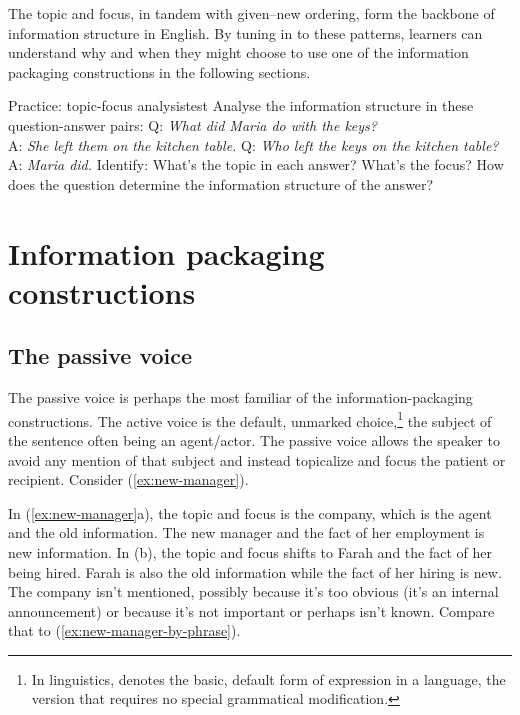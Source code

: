 The topic and focus, in tandem with given--new ordering, form the backbone of information structure in English. By tuning in to these patterns, learners can understand why and when they might choose to use one of the information packaging constructions in the following sections.

\begin{tblsframedsymbol}{Practice: topic-focus analysis}{test}
Analyse the information structure in these question-answer pairs:
\ea
    \ea Q: \emph{What did Maria do with the keys?}\\
    A: \emph{She left them on the kitchen table.}
    \ex Q: \emph{Who left the keys on the kitchen table?}\\
    A: \emph{Maria did.}
    \z
\z
Identify: What's the topic in each answer? What's the focus? How does the question determine the information structure of the answer?
\end{tblsframedsymbol}


\section{Information packaging constructions}

\subsection{The passive voice} \label{sec:passive}

The passive voice is perhaps the most familiar of the information-packaging constructions. The active voice is the default, unmarked choice,\footnote{In linguistics,  denotes the basic, default form of expression in a language, the version that requires no special grammatical modification.} the subject of the sentence often being an agent/actor. The passive voice allows the speaker to avoid any mention of that subject and instead topicalize and focus the patient or recipient.  Consider (\ref{ex:new-manager}).

\ea\label{ex:new-manager}
    \z
\z
In (\ref{ex:new-manager}a), the topic and focus is the company, which is the agent and the old information. The new manager and the fact of her employment is new information. In (b), the topic and focus shifts to Farah and the fact of her being hired. Farah is also the old information while the fact of her hiring is new. The company isn't mentioned, possibly because it's too obvious (it's an internal announcement) or because it's not important or perhaps isn't known. Compare that to (\ref{ex:new-manager-by-phrase}).

